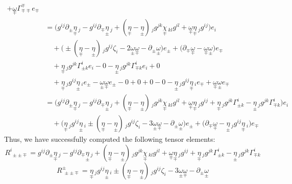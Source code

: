 \documentclass[a4paper,11pt]{article}
\numberwithin{equation}{section}
\theoremstyle{definition}
\begin{document}
\begin{align*}
    + \underset{\mp}{\omega} \Gamma_{\mp\mp}^\mp e_\mp\\
    &=\Big(g^{ij}\partial_\pm \underset{\mp}{\eta}\,_j - g^{ij} \partial_\mp \underset{\pm}{\eta}\,_j + (\underset{\mp}{\eta}-\underset{\pm}{\eta})\,_jg^{jk} \underset{\mp}{\chi}\,_{kl}g^{il} + \underset{\mp}{\omega} \underset{\mp}{\eta}\,_jg^{ij} \Big)e_i\\
    &\quad + \Big(\pm (\underset{\mp}{\eta}-\underset{\pm}{\eta})\,_jg^{ij}\zeta_i - 2\underset{\pm}{\omega}\underset{\mp}{\omega}  - \partial_\pm \underset{\pm}{\omega} \Big)e_\pm 
    + \Big(\partial_\mp \underset{\mp}{\omega} - \underset{\mp}{\omega} \underset{\pm}{\omega} \Big)e_\mp \\
    &\quad + \underset{\mp}{\eta}\,_jg^{jk}\Gamma_{\pm k}^i e_i
    - 0 - \underset{\pm}{\eta}\,_jg^{jk} \Gamma_{\mp k}^i e_i
    + 0\\
    &\quad + \underset{\mp}{\eta}\,_jg^{ij}\underset{\pm}{\eta}\,_i e_\pm
    - \underset{\pm}{\omega} \underset{\mp}{\omega} e_\pm - 0
    + 0 + 0 - 0 - \underset{\pm}{\eta}\,_jg^{ij} \underset{\mp}{\eta}\,_i e_\mp
    + \underset{\mp}{\omega} \underset{\pm}{\omega} e_\mp\\
    &=\Big(g^{ij}\partial_\pm \underset{\mp}{\eta}\,_j - g^{ij} \partial_\mp \underset{\pm}{\eta}\,_j + (\underset{\mp}{\eta}-\underset{\pm}{\eta})\,_jg^{jk} \underset{\mp}{\chi}\,_{kl}g^{il} + \underset{\mp}{\omega} \underset{\mp}{\eta}\,_jg^{ij} + \underset{\mp}{\eta}\,_jg^{jk}\Gamma_{\pm k}^i - \underset{\pm}{\eta}\,_jg^{jk} \Gamma_{\mp k}^i \Big)e_i\\
    &\quad + \Big(\underset{\mp}{\eta}\,_jg^{ij}\underset{\pm}{\eta}\,_i \pm (\underset{\mp}{\eta}-\underset{\pm}{\eta})\,_jg^{ij}\zeta_i - 3\underset{\pm}{\omega}\underset{\mp}{\omega}  - \partial_\pm \underset{\pm}{\omega}\Big)e_\pm 
    + \Big(\partial_\mp \underset{\mp}{\omega} - \underset{\pm}{\eta}\,_jg^{ij} \underset{\mp}{\eta}\,_i \Big)e_\mp
\end{align*}
Thus, we have successfully computed the following tensor elements:
\begin{equation}
    \boxed{R^i_{\;\pm\pm\mp}  = g^{ij}\partial_\pm \underset{\mp}{\eta}\,_j - g^{ij} \partial_\mp \underset{\pm}{\eta}\,_j + (\underset{\mp}{\eta}-\underset{\pm}{\eta})\,_jg^{jk} \underset{\mp}{\chi}\,_{kl}g^{il} + \underset{\mp}{\omega} \underset{\mp}{\eta}\,_jg^{ij} + \underset{\mp}{\eta}\,_jg^{jk}\Gamma_{\pm k}^i - \underset{\pm}{\eta}\,_jg^{jk} \Gamma_{\mp k}^i}
\end{equation}
\begin{equation}
    \boxed{R^\pm_{\;\pm\pm\mp}  = \underset{\mp}{\eta}\,_jg^{ij}\underset{\pm}{\eta}\,_i \pm (\underset{\mp}{\eta}-\underset{\pm}{\eta})\,_jg^{ij}\zeta_i - 3\underset{\pm}{\omega}\underset{\mp}{\omega}  - \partial_\pm \underset{\pm}{\omega}}
\end{equation}
\end{document}
